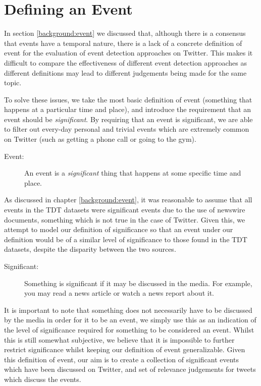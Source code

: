 
\section{Defining an Event}
\label{DefiningEvent}
In section \ref{background:event} we discussed that, although there is a consensus that events have a temporal nature, there is a lack of a concrete definition of event for the evaluation of event detection approaches on Twitter.
This makes it difficult to compare the effectiveness of different event detection approaches as different definitions may lead to different judgements being made for the same topic.

To solve these issues, we take the most basic definition of event (something that happens at a particular time and place), and introduce the requirement that an event should be \textit{significant}.
By requiring that an event is significant, we are able to filter out every-day personal and trivial events which are extremely common on Twitter (such as getting a phone call or going to the gym).
\begin{description}
\item[Event:] An event is a \emph{significant} thing that happens at some specific time and place.
\end{description}
As discussed in chapter \ref{background:event}, it was reasonable to assume that all events in the TDT datasets were significant events due to the use of newswire documents, something which is not true in the case of Twitter.
Given this, we attempt to model our definition of significance so that an event under our definition would be of a similar level of significance to those found in the TDT datasets, despite the disparity between the two sources.
\begin{description}
\item[Significant:] Something is significant if it may be discussed in the media. For example, you may read a news article or watch a news report about it.
\end{description}
It is important to note that something does not necessarily have to be discussed by the media in order for it to be an event, we simply use this as an indication of the level of significance required for something to be considered an event.
Whilst this is still somewhat subjective, we believe that it is impossible to further restrict significance whilst keeping our definition of event generalizable.
Given this definition of event, our aim is to create a collection of significant events which have been discussed on Twitter, and set of relevance judgements for tweets which discuss the events.

